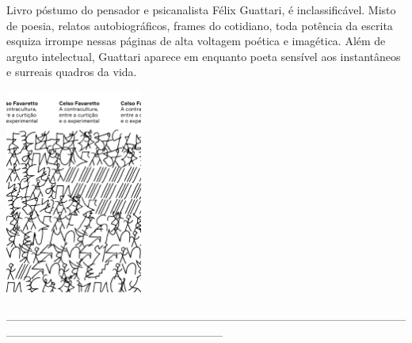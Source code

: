 {\medskip

\noindent{}Livro póstumo do pensador e psicanalista Félix Guattari, {} é inclassificável. Misto de poesia, relatos autobiográficos, frames do cotidiano, toda potência da escrita esquiza irrompe nessas páginas de alta voltagem poética e imagética. Além de arguto intelectual, Guattari aparece em {} enquanto poeta sensível aos instantâneos e surreais quadros da vida.

\hspace{.5cm}

\hspace*{-.4cm}\begin{minipage}[c]{0.90\linewidth}
\small{
{}}
\end{minipage}

\pagebreak

\hspace{.5cm}

\begin{center}
\hspace*{-.5cm}\includegraphics[width=45mm]{./imgs/favaretto.png}
\end{center}

\hspace*{-2cm}\_\_\_\_\_\_\_\_\_\_\_\_\_\_\_\_\_\_\_\_\_\_\_\_\_\_\_\_\_\_\_\_\_\_\_\_\_\_\_\_\_\_\_\_\_\_\_\_\_\_\_\_\_\_\_\_\_\_\_\_\_\_\_\_\_\_\_\_\_\_\_\_\_\_

\medskip

}
